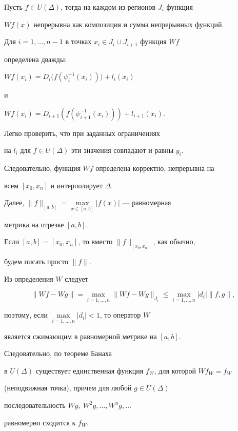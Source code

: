 \begin{pf}


Пусть $f \in U(\Delta)$, тогда на каждом из регионов $ J_i$ функция


$ Wf(x) $ непрерывна как композиция и сумма непрерывных функций.


Для $i=1,\dotsc,n-1$ в точках $x_i \in J_i \cup J_{i+1} $ функция $W f$


определена дважды:


$W f(x_i) = D_i \big(f\left (\psi_i^{-1} (x_i) \right) \big) + l_i(x_i)$


и


$W f(x_{i}) = D_{i+1} (f (\psi^{-1}_{i+1} (x_{i}))) + l_{i+1}(x_{i})$.


Легко проверить, что при заданных ограничениях


на $l_i$ для $f\in U(\Delta)$ эти значения совпадают и равны $y_i$.


Следовательно, функция $W f$ определена корректно, непрерывна на


всем $[x_0,x_n]$ и интерполирует $\Delta$.





Далее, $\|f\|_{[a,b]} = \max\limits_{x\in [a,b]} |f(x)| $ --- равномерная


метрика на отрезке $[a,b]$.


Если $[a,b]=[x_0,x_n]$, то вместо $\|f\|_{[x_0,x_n]}$, как обычно,


будем писать просто $\|f\|$.


Из определения $W$ следует


$$


\| Wf - Wg \| = \max_{i=1,\dotsc,n} \| Wf - Wg \|_{J_i}


\le \max_{i=1,\dotsc,n} |d_i| \| f, g \|,


$$


поэтому, если $ \max\limits_{i=1,\dotsc,n} |d_i|<1 $, то оператор $W$


является сжимающим в равномерной метрике на $[a,b]$.


Следовательно, по теореме Банаха


в $U(\Delta)$ существует единственная функция $f_W$, для которой $ W f_W=f_W$


(неподвижная точка), причем для любой $g\in U (\Delta)$


последовательность $ W g,\ W^2 g,\dotsc, W^n g,\dotsc $


равномерно сходится к $f_W$.


\end{pf}





